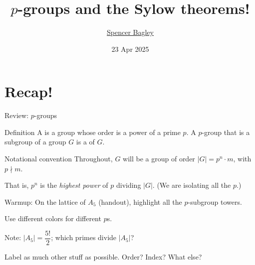 \documentclass[8pt, handout]{beamer}
\title[$p$-groups and the Sylow theorems!]{$p$-groups and the Sylow theorems!}
\author[\href{mailto:sbagley@westminsteru.edu}{S. Bagley}]
       {\href{mailto:sbagley@westminsteru.edu}{Spencer Bagley}}
\institute[Westminster] { 
  \normalsize With many thanks to Matthew Macauley, \\
  \url{http://www.math.clemson.edu/~macaule/}}
\date[23 Apr 2025]{23 Apr 2025}
\begin{document}
\frame{\titlepage}


\section{Recap!}


\begin{frame}{Review: $p$-groups} 

  \begin{block}{Definition} 
    A  is a group whose order is a power of a prime
    $p$. A $p$-group that is a subgroup of a group $G$ is a
     of $G$.
  \end{block}

  \medskip

  \begin{exampleblock}{Notational convention}
    Throughout, $G$ will be a group of order $|G|=p^n\cdot m$, with
    $p\nmid m$. 
    
    That is, $p^n$ is the \emph{highest power} of $p$
    dividing $|G|$. (We are isolating all the $p$.)
  \end{exampleblock}

  \medskip

  Warmup: On the lattice of $A_5$ (handout), highlight all the $p$-subgroup towers.
  
  \medskip
  
  Use different colors for different $p$s.
  
  \medskip
  
  Note: $|A_5| = \dfrac{5!}{2}$; which primes divide $|A_5|$?

  \medskip
  
  Label as much other stuff as possible. Order? Index? What else?

\end{frame}

\end{document}
